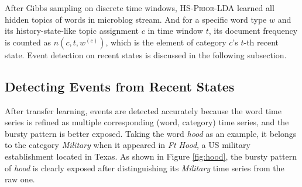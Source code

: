 \documentclass{article}
\begin{document}

After Gibbs sampling on discrete time windows, \textsc{HS-Prior-LDA} learned all hidden topics of words in microblog stream.
And for a specific word type \(w\) and its history-state-like topic assignment \(c\) in time window \(t\), its document frequency is counted as \(n(c,t,w^{(c)})\), which is the element of category \(c\)'s \(t\)-th recent state.
Event detection on recent states is discussed in the following subsection.

\subsection{Detecting Events from Recent States}
\label{subsec:detection}
After transfer learning, events are detected accurately because the word time series is refined as multiple corresponding (word, category) time series, and the bursty pattern is better exposed. 
Taking the word \textit{hood} as an example, it belongs to the category \textit{Military} when it appeared in \textit{Ft Hood}, a US military establishment located in Texas.
As shown in Figure \ref{fig:hood}, the bursty pattern of \textit{hood} is clearly exposed after distinguishing its \textit{Military} time series from the raw one.
\end{document}
